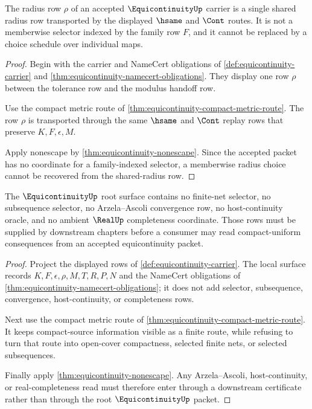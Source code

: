 \begin{theorem}
\label{thm:equicontinuity-root-obligation-shared-radius}
The radius row $\rho$ of an accepted $\EquicontinuityUp$ carrier is a single
shared radius row transported by the displayed $\hsame$ and $\Cont$ routes. It
is not a memberwise selector indexed by the family row $F$, and it cannot be
replaced by a choice schedule over individual maps.
\end{theorem}
\begin{proof}
Begin with the carrier and NameCert obligations of
\autoref{def:equicontinuity-carrier} and
\autoref{thm:equicontinuity-namecert-obligations}. They display one row
$\rho$ between the tolerance row and the modulus handoff row.

Use the compact metric route of
\autoref{thm:equicontinuity-compact-metric-route}. The row $\rho$ is
transported through the same $\hsame$ and $\Cont$ replay rows that preserve
$K,F,\epsilon,M$.

Apply nonescape by \autoref{thm:equicontinuity-nonescape}. Since the accepted
packet has no coordinate for a family-indexed selector, a memberwise radius
choice cannot be recovered from the shared-radius row.
\end{proof}

\begin{theorem}
\label{thm:equicontinuity-root-obligation-nonescape}
The $\EquicontinuityUp$ root surface contains no finite-net selector, no
subsequence selector, no Arzela--Ascoli convergence row, no host-continuity
oracle, and no ambient $\RealUp$ completeness coordinate. Those rows must be
supplied by downstream chapters before a consumer may read compact-uniform
consequences from an accepted equicontinuity packet.
\end{theorem}
\begin{proof}
Project the displayed rows of \autoref{def:equicontinuity-carrier}. The local
surface records $K,F,\epsilon,\rho,M,T,R,P,N$ and the NameCert obligations of
\autoref{thm:equicontinuity-namecert-obligations}; it does not add selector,
subsequence, convergence, host-continuity, or completeness rows.

Next use the compact metric route of
\autoref{thm:equicontinuity-compact-metric-route}. It keeps compact-source
information visible as a finite route, while refusing to turn that route into
open-cover compactness, selected finite nets, or selected subsequences.

Finally apply \autoref{thm:equicontinuity-nonescape}. Any Arzela--Ascoli,
host-continuity, or real-completeness read must therefore enter through a
downstream certificate rather than through the root $\EquicontinuityUp$ packet.
\end{proof}

